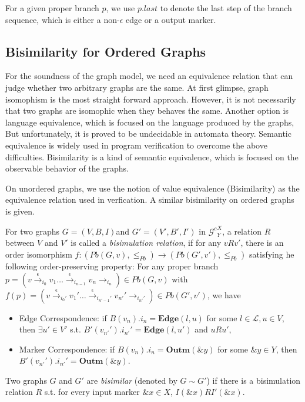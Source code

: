 \documentclass{llncs}
\newcommand{\act}[1]{{\xrightarrow{#1}{}}}
\newcommand{\Gc}{{\mathcal{G}^{c}}}
\begin{document}
For a given proper branch $p$, we use $p.last$ to denote the last step of the branch sequence, which is either a non-$\epsilon$ edge or a output marker.

\subsection{Bisimilarity for Ordered Graphs}\label{subsec:bis}

For the soundness of the graph model, we need an equivalence relation that can judge whether two arbitrary graphs are the same. At first glimpse, graph isomophism is the most straight forward approach. However, it is not necessarily that two graphs are isomophic when they behaves the same. Another option is language equivalence, which is focused on the language produced by the graphs, But unfortunately, it is proved to be undecidable in automata theory. Semantic equivalence is widely used in program verification to overcome the above difficulties. Bisimilarity is a kind of semantic equivalence, which is focused on the observable behavior of the graphs. 

On unordered graphs, we use the notion of value equivalence (Bisimilarity) as the equivalence relation used in verfication. A similar bisimilarity on ordered graphs is given.

For two graphs $G=(V,B,I)$and $G'=(V',B',I')$ in $\Gc^X_Y$, a relation $R$ between $V$ and $V'$ is called a \emph{bisimulation relation}, if for any $vRv'$, there is an order isomorphism $f:(Pb(G,v),\leq_{Pb})\rightarrow(Pb(G',v'),\leq_{Pb})$ satisfying he following order-preserving property: For any proper branch $p=(v\act{\epsilon}_{i_0}v_1\ldots\act{\epsilon}_{i_{n-1}}v_n\act{}_{i_n})\in Pb(G,v)$ with $f(p)=(v\act{\epsilon}_{i_0'}v_1'\ldots\act{\epsilon}_{i_{n'-1}'}v_{n'}'\act{}_{i_{n'}'})\in Pb(G',v')$, we have
\begin{itemize}
    \item Edge Correspondence: if $B(v_n).i_n=\mathbf{Edge}(l,u)$ for some $l\in\mathcal{L}, u\in V$, then  $\exists u'\in V'$ s.t. $B'(v_{n'}').i_{n'}'=\mathbf{Edge}(l,u')$ and $uRu'$,
    \item Marker Correspondence: if $B(v_n).i_n=\mathbf{Outm}(\&y)$ for some $\&y\in Y$, then $B'(v_{n'}').i_{n'}'=\mathbf{Outm}(\&y)$.
\end{itemize}
Two graphs $G$ and $G'$ are \emph{bisimilar} (denoted by $G\sim G'$) if there is a bisimulation relation $R$ s.t. for every input marker $\&x\in X$, $I(\&x)RI'(\&x)$.
\end{document}
